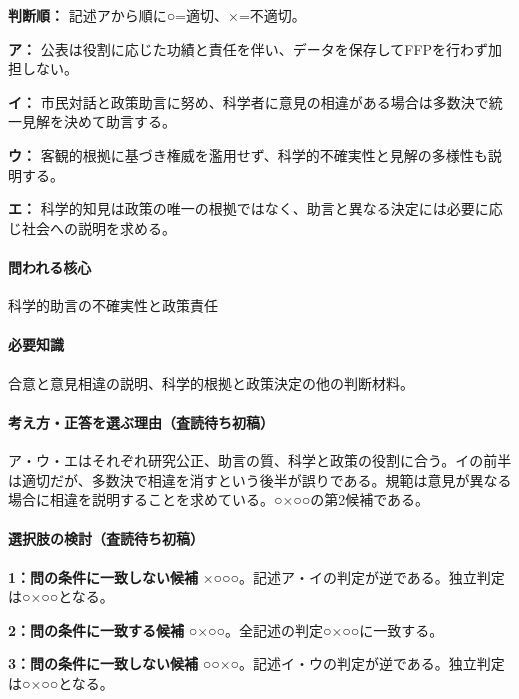 \noindent\textbf{判断順：} 記述アから順に○=適切、×=不適切。\par

\noindent\textbf{ア：} 公表は役割に応じた功績と責任を伴い、データを保存してFFPを行わず加担しない。\par

\noindent\textbf{イ：} 市民対話と政策助言に努め、科学者に意見の相違がある場合は多数決で統一見解を決めて助言する。\par

\noindent\textbf{ウ：} 客観的根拠に基づき権威を濫用せず、科学的不確実性と見解の多様性も説明する。\par

\noindent\textbf{エ：} 科学的知見は政策の唯一の根拠ではなく、助言と異なる決定には必要に応じ社会への説明を求める。\par

\paragraph{問われる核心} 科学的助言の不確実性と政策責任

\paragraph{必要知識} 合意と意見相違の説明、科学的根拠と政策決定の他の判断材料。

\paragraph{考え方・正答を選ぶ理由（査読待ち初稿）} ア・ウ・エはそれぞれ研究公正、助言の質、科学と政策の役割に合う。イの前半は適切だが、多数決で相違を消すという後半が誤りである。規範は意見が異なる場合に相違を説明することを求めている。○×○○の第2候補である。

\paragraph{選択肢の検討（査読待ち初稿）}\mbox{}\par

\noindent\textbf{1：問の条件に一致しない候補} ×○○○。記述ア・イの判定が逆である。独立判定は○×○○となる。\par

\noindent\textbf{2：問の条件に一致する候補} ○×○○。全記述の判定○×○○に一致する。\par

\noindent\textbf{3：問の条件に一致しない候補} ○○×○。記述イ・ウの判定が逆である。独立判定は○×○○となる。\par

